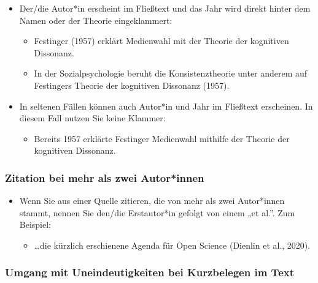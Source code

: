 \documentclass[
  letterpaper,
  DIV=11]{scrreprt}
\providecommand{\tightlist}{%
  \setlength{\itemsep}{0pt}\setlength{\parskip}{0pt}}\usepackage{longtable,booktabs,array}
\begin{document}
\begin{itemize}
\item
  Der/die Autor*in erscheint im Fließtext und das Jahr wird direkt
  hinter dem Namen oder der Theorie eingeklammert:

  \begin{itemize}
  \item
    Festinger (1957) erklärt Medienwahl mit der Theorie der kognitiven
    Dissonanz.
  \item
    In der Sozialpsychologie beruht die Konsistenztheorie unter anderem
    auf Festingers Theorie der kognitiven Dissonanz (1957).
  \end{itemize}
\item
  In seltenen Fällen können auch Autor*in und Jahr im Fließtext
  erscheinen. In diesem Fall nutzen Sie keine Klammer:

  \begin{itemize}
  \tightlist
  \item
    Bereits 1957 erklärte Festinger Medienwahl mithilfe der Theorie der
    kognitiven Dissonanz.
  \end{itemize}
\end{itemize}

\hypertarget{zitation-bei-mehr-als-zwei-autorinnen}{%
\subsubsection{Zitation bei mehr als zwei
Autor*innen}\label{zitation-bei-mehr-als-zwei-autorinnen}}

\begin{itemize}
\item
  Wenn Sie aus einer Quelle zitieren, die von mehr als zwei Autor*innen
  stammt, nennen Sie den/die Erstautor*in gefolgt von einem „et al.''.
  Zum Beispiel:

  \begin{itemize}
  \tightlist
  \item
    \ldots die kürzlich erschienene Agenda für Open Science (Dienlin et
    al., 2020).
  \end{itemize}
\end{itemize}

\hypertarget{umgang-mit-uneindeutigkeiten-bei-kurzbelegen-im-text}{%
\subsubsection{Umgang mit Uneindeutigkeiten bei Kurzbelegen im
Text}\label{umgang-mit-uneindeutigkeiten-bei-kurzbelegen-im-text}}
\end{document}
